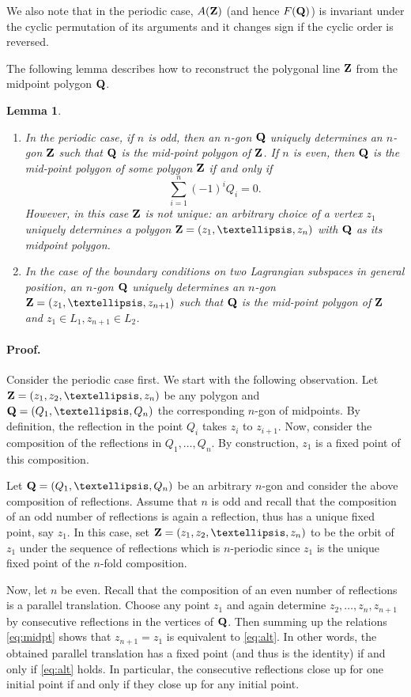 \documentclass[12pt]{article}
\newtheorem{lemma}{Lemma}[section]
\def\proof{\paragraph{Proof.}}
\begin{document}
We also note that in the periodic case, $A({\bf Z})$ (and hence $F({\bf Q})$) is invariant under the cyclic permutation of its arguments and it changes sign if the cyclic order is reversed.

The following lemma describes how to reconstruct the polygonal line ${\bf Z}$ from the midpoint polygon ${\bf Q}$. 

\begin{lemma} \label{lm:rec}
$ $
\begin{enumerate}
\item In the periodic case, if $n$ is odd, then an $n$-gon ${\bf Q}$ uniquely determines an $n$-gon ${\bf Z}$ such that ${\bf Q}$ is the mid-point polygon of ${\bf Z}$.
If $n$ is even, then ${\bf Q}$ is the mid-point polygon of some polygon ${\bf Z}$ if and only if
\begin{equation} \label{eq:alt}
\sum_{i=1}^n (-1)^i Q_i =0.
\end{equation}
However, in this case ${\bf Z}$ is not unique: an arbitrary choice of a vertex $z_1$ uniquely determines a polygon ${\bf Z}=(z_1,\ldots,z_n)$ with ${\bf Q}$ as its midpoint polygon.
\item In the case of the boundary conditions on two Lagrangian subspaces in general position, an $n$-gon ${\bf Q}$ uniquely determines an $n$-gon ${\bf Z}=(z_1,\ldots, z_{n+1})$ such that ${\bf Q}$ is the mid-point polygon of ${\bf Z}$ and $z_1\in L_1, z_{n+1} \in L_2$.
\end{enumerate}
\end{lemma}

\proof
Consider the periodic case first. 
We start with the following observation. Let ${\bf Z}=(z_1,z_2,\ldots,z_n)$ be any polygon and ${\bf Q}=(Q_1,\ldots,Q_n)$ the corresponding $n$-gon of midpoints. By definition, the reflection in the point $Q_i$ takes $z_i$ to $z_{i+1}$. Now, consider the composition of the reflections in $Q_1,\ldots, Q_n$. By construction, $z_1$ is a fixed point of this composition. 

Let ${\bf Q}=(Q_1,\ldots,Q_n)$ be an arbitrary $n$-gon and consider the above composition of reflections. Assume that $n$ is odd and recall that the composition of an odd number of reflections is again a reflection, thus has a unique fixed point, say $z_1$. In this case, set ${\bf Z}=(z_1,z_2,\ldots,z_n)$ to be the orbit of $z_1$ under the sequence of reflections which is $n$-periodic since $z_1$ is the unique fixed point of the $n$-fold composition.

Now, let $n$ be even. Recall that the composition of an even number of reflections is a parallel translation. Choose any point $z_1$ and again determine $z_2,\ldots,z_n, z_{n+1}$ by consecutive reflections in the vertices of ${\bf Q}$. Then summing up the relations \eqref{eq:midpt} shows that $z_{n+1}=z_1$ is equivalent to \eqref{eq:alt}. In other words, the obtained parallel translation has a fixed point (and thus is the identity) if and only if \eqref{eq:alt} holds. In particular, the consecutive reflections close up for one initial point if and only if they close up for any initial point.
\end{document}
